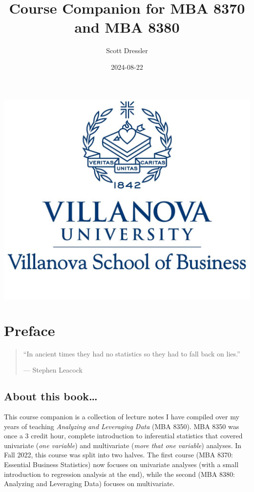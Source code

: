 \documentclass[
]{book}
\title{Course Companion for MBA 8370 and MBA 8380}
\author{Scott Dressler}
\date{2024-08-22}
\begin{document}
\maketitle

{
\setcounter{tocdepth}{1}
\tableofcontents
}
\chapter*{}\label{section}

\begin{center}\includegraphics[width=14.36in]{images/VU17BLUE3} \end{center}

\chapter*{Preface}\label{preface}

\begin{quote}
``In ancient times they had no statistics so they had to fall back on lies.''

--- Stephen Leacock
\end{quote}

\section*{About this book\ldots{}}\label{about-this-book}

This course companion is a collection of lecture notes I have compiled over my years of teaching \emph{Analyzing and Leveraging Data} (MBA 8350). MBA 8350 was once a 3 credit hour, complete introduction to inferential statistics that covered univariate (\emph{one variable}) and multivariate (\emph{more that one variable}) analyses. In Fall 2022, this course was split into two halves. The first course (MBA 8370: Essential Business Statistics) now focuses on univariate analyses (with a small introduction to regression analysis at the end), while the second (MBA 8380: Analyzing and Leveraging Data) focuses on multivariate.
\end{document}

